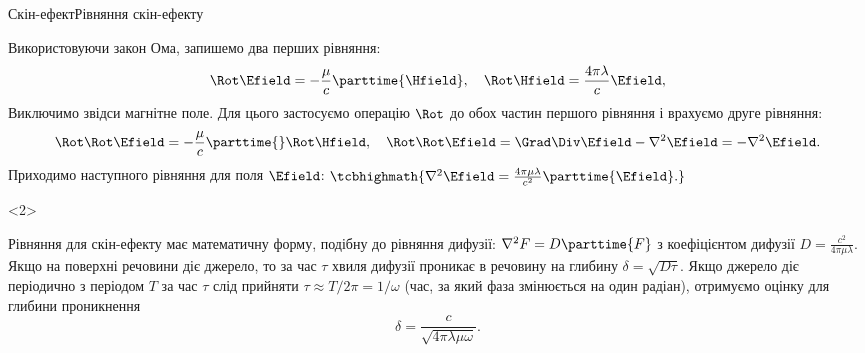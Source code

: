 \documentclass[onlytextwidth]{beamer}
\begin{document}
\begin{frame}{Скін-ефект}{Рівняння скін-ефекту}
\begin{onlyenv}
		\begin{block}{}\justifying
			Використовуючи закон
			Ома, запишемо два перших рівняння:
			\begin{equation*}
				\Rot\Efield = - \frac{\mu}{c}\parttime{\Hfield},\quad \Rot\Hfield = \frac{4\pi\lambda}{c}\Efield,
			\end{equation*}
			Виключимо звідси магнітне поле. Для цього застосуємо операцію $\Rot$ до
			обох частин першого рівняння і врахуємо друге рівняння:
			\begin{equation*}
				\Rot\Rot\Efield = - \frac{\mu}{c}\parttime{}\Rot\Hfield, \quad \Rot\Rot\Efield = \Grad\Div\Efield - \nabla^2\Efield = -
				\nabla^2\Efield.
			\end{equation*}
			Приходимо наступного рівняння для поля $\Efield$:
			\(
			\tcbhighmath{\nabla^2\Efield = \frac{4\pi\mu\lambda}{c^2}\parttime{\Efield}.}
			\)
		\end{block}
	\end{onlyenv}
	\begin{onlyenv}
		\begin{block}{}\justifying\small
			Рівняння для скін-ефекту має математичну форму, подібну до рівняння дифузії:
			\(
			\nabla^2 F = D \parttime{F}
			\)
			з коефіцієнтом дифузії $D = \frac{c^2}{4\pi\mu\lambda}$. Якщо на
			поверхні речовини діє джерело, то за час $\tau$ хвиля дифузії
			проникає в речовину на глибину $\delta = \sqrt{D\tau}$. Якщо джерело діє
			періодично з періодом $T$ за час $\tau$ слід прийняти
			$\tau \approx T/2\pi = 1/\omega$ (час, за який фаза змінюється на один радіан), отримуємо \alert{оцінку} для глибини проникнення
			\begin{equation*}
				\delta =\frac{c}{\sqrt{4\pi\lambda\mu\omega}}.
			\end{equation*}
		\end{block}


\end{onlyenv}
\end{frame}
\end{document}
